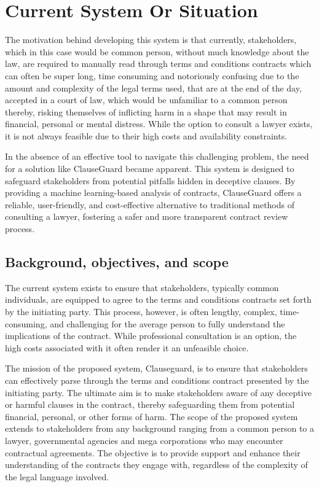 \chapter{Current System Or Situation \\
\label{Chapter::Current System Or Situation}}
The motivation behind developing this system is that currently, stakeholders, which in this case would be common person, without much knowledge about the law, are required to manually read through terms and conditions contracts which can often be super long, time consuming and notoriously confusing due to the amount and complexity of the legal terms used, that are at the end of the day, accepted in a court of law, which would be unfamiliar to a common person thereby, risking themselves of inflicting harm in a shape that may result in financial, personal or mental distress. While the option to consult a lawyer exists, it is not always feasible due to their high costs and availability constraints.

In the absence of an effective tool to navigate this challenging problem, the need for a solution like ClauseGuard became apparent. This system is designed to safeguard stakeholders from potential pitfalls hidden in deceptive clauses. By providing a machine learning-based analysis of contracts, ClauseGuard offers a reliable, user-friendly, and cost-effective alternative to traditional methods of consulting a lawyer, fostering a safer and more transparent contract review process.  

\section{Background, objectives, and scope \label{Section::Background,objectives and scope} }
The current system exists to ensure that stakeholders, typically common individuals, are equipped to agree to the terms and conditions contracts set forth by the initiating party. This process, however, is often lengthy, complex, time-consuming, and challenging for the average person to fully understand the implications of the contract. While professional consultation is an option, the high costs associated with it often render it an unfeasible choice.

The mission of the proposed system, Clauseguard, is to ensure that stakeholders can effectively parse through the terms and conditions contract presented by the initiating party. The ultimate aim is to make stakeholders aware of any deceptive or harmful clauses in the contract, thereby safeguarding them from potential financial, personal, or other forms of harm.
 The scope of the proposed system extends to stakeholders from any background ranging from a common person to a lawyer, governmental agencies and mega corporations who may encounter contractual agreements. The objective is to provide support and enhance their understanding of the contracts they engage with, regardless of the complexity of the legal language involved. 



